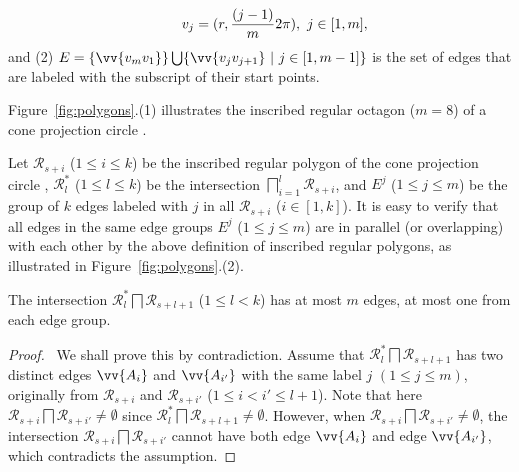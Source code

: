 \vspace{-2ex}
\begin{equation*}
\label{equ-regular-polygon}
    \begin{aligned}
        \hspace{5ex}  v_j = (r, \frac{(j-1)}{m}2\pi), ~j \in [1, m], \\
    \end{aligned}
\end{equation*}
%
\ni and (2) $E= \{\vv{v_mv_1}\} \bigcup \{\vv{v_jv_{j+1}}\ |\ j\in [1, m-1]\}$ is the set of edges that are labeled with the subscript of their start points.


Figure~\ref{fig:polygons}.(1) illustrates the inscribed regular octagon ($m=8$) of a cone projection circle .

Let $\mathcal{R}_{s+i}$ ($1\le i \le k$) be the inscribed regular polygon of the cone projection  circle ,
$\mathcal{R}^*_l$ ($1\le l\le k$) be the intersection $\bigsqcap_{i=1}^{l}\mathcal{R}_{s+i}$,
and $E^j$ ($1\le j \le m$) be the group of $k$ edges labeled with $j$ in all $\mathcal{R}_{s+i}$ ($i\in[1, k]$).
%
It is easy to verify that all edges in the same edge groups $E^j$ ($1\le j\le m$) are in parallel (or overlapping) with each other by the above definition of inscribed regular polygons, as illustrated in Figure~\ref{fig:polygons}.(2).


\begin{prop}
\label{prop-rp-intersection}
The intersection $\mathcal{R}^*_{l} \bigsqcap \mathcal{R}_{s+l+1}$ ($ 1\le l< k$) has at most $m$ edges, \ie at most one from each edge group.
\end{prop}





\begin{proof}\
We shall prove this by contradiction.
Assume that $\mathcal{R}^*_{l} \bigsqcap \mathcal{R}_{s+l+1}$ has two distinct edges $\vv{A_i}$ and $\vv{A_{i'}}$  with the same label $j$ $(1\le j \le m)$, originally from
$\mathcal{R}_{s+i}$ and $\mathcal{R}_{s+i'}$  ($1\le i< i' \le l+1$).
%
Note that here $\mathcal{R}_{s+i} \bigsqcap \mathcal{R}_{s+i'} \ne \emptyset$ since $\mathcal{R}^*_l \bigsqcap \mathcal{R}_{s+l+1} \ne \emptyset$.
%
However, when $\mathcal{R}_{s+i} \bigsqcap \mathcal{R}_{s+i'} \ne \emptyset$, the intersection $\mathcal{R}_{s+i} \bigsqcap \mathcal{R}_{s+i'}$ cannot have
both edge $\vv{A_i}$ and edge $\vv{A_{i'}}$, which contradicts the assumption. \eop
\end{proof}


